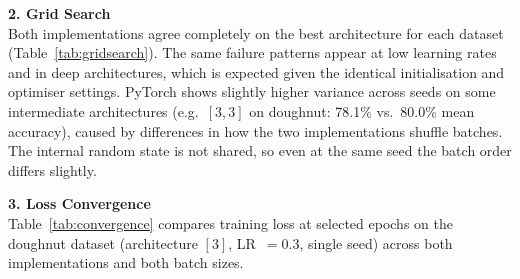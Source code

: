 \documentclass[fleqn,moreauthors,10pt]{ds_report}
\begin{document}
\textbf{2. Grid Search}\\
Both implementations agree completely on the best architecture for each dataset
(Table~\ref{tab:gridsearch}). The same failure patterns appear at low learning rates
and in deep architectures, which is expected given the identical initialisation and
optimiser settings. PyTorch shows slightly higher variance across seeds on some
intermediate architectures (e.g.\ $[3,3]$ on doughnut: 78.1\% vs.\ 80.0\% mean
accuracy), caused by differences in how the two implementations shuffle batches.
The internal random state is not shared, so even at the same seed the batch order
differs slightly.
\vspace{0.3cm}
 
\textbf{3. Loss Convergence}\\
Table~\ref{tab:convergence} compares training loss at selected epochs on the
doughnut dataset (architecture $[3]$, LR~$= 0.3$, single seed) across both
implementations and both batch sizes.

\begin{table}[h!]
    \centering
    \caption{Training loss vs.\ epoch (Doughnut, arch=[3], LR=0.3).}
    \vspace{0.1cm}
    \label{tab:convergence}
    \vspace{0.1cm}
\end{table}
\end{document}
